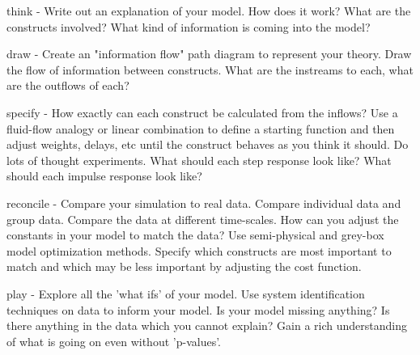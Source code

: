 \documentclass[conference]{IEEEtran}
\begin{document}
think - 
Write out an explanation of your model. 
How does it work? 
What are the constructs involved? 
What kind of information is coming into the model?

draw - 
Create an "information flow" path diagram to represent your theory. 
Draw the flow of information between constructs. 
What are the instreams to each, what are the outflows of each?

specify - 
How exactly can each construct be calculated from the inflows? 
Use a fluid-flow analogy or linear combination to define a starting function and then adjust weights, delays, etc until the construct behaves as you think it should. 
Do lots of thought experiments. 
What should each step response look like? 
What should each impulse response look like?

reconcile - 
Compare your simulation to real data. 
Compare individual data and group data. 
Compare the data at different time-scales. 
How can you adjust the constants in your model to match the data? 
Use semi-physical and grey-box model optimization methods. 
Specify which constructs are most important to match and which may be less important by adjusting the cost function.

play - 
Explore all the 'what ifs' of your model. 
Use system identification techniques on data to inform your model. 
Is your model missing anything? 
Is there anything in the data which you cannot explain? 
Gain a rich understanding of what is going on even without 'p-values'.
\end{document}
